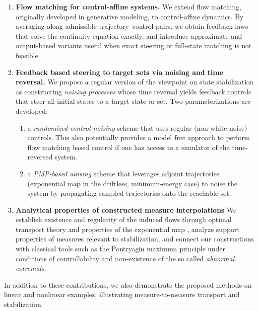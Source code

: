 \documentclass{article}
\begin{document}
\begin{enumerate}
    \item \textbf{Flow matching for control-affine systems.} 
    We extend flow matching, originally developed in generative modeling, to control-affine dynamics. By averaging along admissible trajectory–control pairs, we obtain feedback laws that solve the continuity equation exactly, and introduce approximate and output-based variants useful when exact steering or full-state matching is not feasible.

    \item \textbf{Feedback based steering to target sets via noising and time reversal.} 
    We propose a regular version of the viewpoint \cite{elamvazhuthi2025score,mei2025time} on state stabilization as constructing \emph{noising processes} whose time reversal yields feedback controls that steer all initial states to a target state or set. Two parameterizations are developed:
    \begin{enumerate}
        \item a \emph{randomized-control noising} scheme that uses regular (non-white noise) controls. This also potentially provides a model free approach to perform flow matching based control if one has access to a simulator of the time-reversed system.
        \item a \emph{PMP-based noising} scheme that leverages adjoint trajectories (exponential map in the driftless, minimum-energy case) to noise the system by propagating sampled trajectories onto the reachable set.    
    \end{enumerate}

    \item \textbf{Analytical properties of constructed measure interpolations} 
    We establish existence and regularity of the induced flows through optimal transport theory and properties of the exponential map \cite{agrachev2009any,agrachev2009optimal,rifford2005morse,rifford2009stabilization}, analyze support properties of measures relevant to stabilization, and connect our constructions with classical tools such as the Pontryagin maximum principle under conditions of  controllability and non-existence of the so called {\it abnormal extremals}.
\end{enumerate}

In addition to these contributions,  we also demonstrate the proposed methods on linear and nonlinear examples, illustrating measure-to-measure transport and stabilization.
\end{document}
